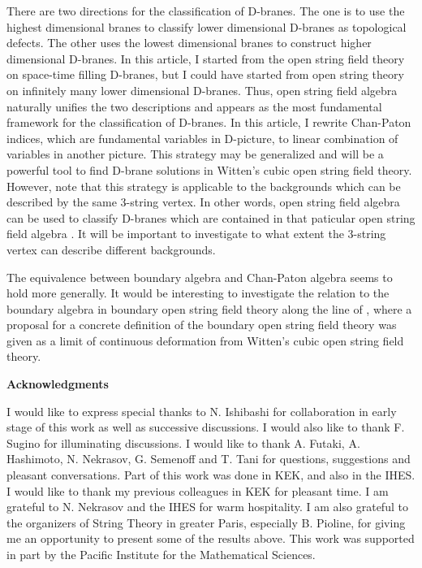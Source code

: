 \documentclass[a4paper,12pt]{article}
\newcommand{\vs}[1]{\vspace{#1 mm}}
\begin{document}
There are two directions for the
classification of D-branes.
The one is to use
the highest dimensional branes \cite{KM,KWitt}
to classify
lower dimensional D-branes
as topological defects.
The other uses the
lowest dimensional branes \cite{AST}
to construct higher dimensional D-branes.
In this article, 
I started from 
the open string field theory on
space-time filling D-branes,
but I could have started from
open string theory on
infinitely many lower dimensional
D-branes.
Thus, open string field algebra
naturally unifies the two descriptions and 
appears as
the most fundamental framework for the classification of 
D-branes.
In this article, I rewrite
Chan-Paton indices, which are
fundamental variables in D-picture, to
linear combination of variables in another picture.
This strategy may be generalized
and will be a powerful tool to find
D-brane solutions in
Witten's cubic open string field theory.
However, note that this strategy is
applicable to the backgrounds
which can be described by the
same 3-string vertex.
In other words,
open string field algebra
can be used to classify
D-branes which are
contained in that paticular
open string field algebra \cite{Aki}.
It will be important to investigate
to what extent the
3-string vertex can describe
different backgrounds.





The equivalence between
boundary algebra
and Chan-Paton algebra seems
to hold more generally.
It would be interesting to investigate
the relation to the boundary algebra 
\cite{Gera} in
boundary open
string field theory \cite{BOSFT}
along the line of \cite{Nakatsu},
where a proposal for a
concrete definition of the boundary
open string field theory 
was given
as a limit of
continuous deformation from
Witten's cubic open string field theory.





\vskip 10mm
\centerline{\bf Acknowledgments}
\vs{1.5}
\noindent
I would like to express special thanks to 
N. Ishibashi
for collaboration in early stage of this work
as well as successive discussions.
I would also like to thank
F. Sugino for illuminating discussions.
I would like to thank 
A. Futaki, A. Hashimoto, N. Nekrasov,
G. Semenoff and T. Tani for 
questions, suggestions and pleasant conversations. 
Part of this work was done in KEK, and also in the IHES.
I would like to thank my previous colleagues in KEK
for pleasant time.
I am grateful to N. Nekrasov and the IHES for warm hospitality.
I am also grateful 
to the organizers of String Theory in greater Paris,
especially B. Pioline,
for giving me an opportunity
to present some of the results above.
This work was supported in part by
the Pacific Institute for the Mathematical Sciences.
\end{document}

